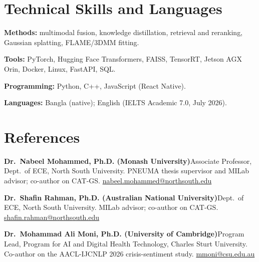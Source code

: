 \documentclass[a4paper,11pt]{article}
\newcommand{\referee}[4]{%
\par\addvspace{2.5pt}%
\begingroup\raggedright
\setlength{\hangindent}{1.25em}\setlength{\hangafter}{1}%
{\small\textbf{#1}\enspace #2. #3. \mbox{\href{mailto:#4}{#4}}\par}%
\endgroup}
\begin{document}
\section{Technical Skills and Languages}
{\small\RaggedRight
\textbf{Methods:} multimodal fusion, knowledge distillation, retrieval and reranking, Gaussian
splatting, FLAME/3DMM fitting.\par
\textbf{Tools:} PyTorch, Hugging Face Transformers, FAISS, TensorRT, Jetson AGX Orin, Docker,
Linux, FastAPI, SQL.\par
\textbf{Programming:} Python, C++, JavaScript (React Native).\par
\textbf{Languages:} Bangla (native); English (IELTS Academic 7.0, July 2026).\par}

\section{References}
\referee{Dr.~Nabeel Mohammed, Ph.D. (Monash University)}
{Associate Professor, Dept.~of ECE, North South University}
{PNEUMA thesis supervisor and MILab advisor; co-author on CAT-GS}
{nabeel.mohammed@northsouth.edu}
\referee{Dr.~Shafin Rahman, Ph.D. (Australian National University)}
{Dept.~of ECE, North South University}
{MILab advisor; co-author on CAT-GS}
{shafin.rahman@northsouth.edu}
\referee{Dr.~Mohammad Ali Moni, Ph.D. (University of Cambridge)}
{Program Lead, Program for AI and Digital Health Technology, Charles Sturt University}
{Co-author on the AACL-IJCNLP 2026 crisis-sentiment study}
{mmoni@csu.edu.au}
\end{document}
